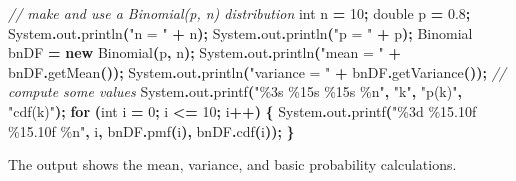 \documentclass[
]{book}
\newenvironment{Shaded}{\begin{snugshade}}{\end{snugshade}}
\newcommand{\BuiltInTok}[1]{#1}
\newcommand{\CommentTok}[1]{\textcolor[rgb]{0.56,0.35,0.01}{\textit{#1}}}
\newcommand{\ControlFlowTok}[1]{\textcolor[rgb]{0.13,0.29,0.53}{\textbf{#1}}}
\newcommand{\DataTypeTok}[1]{\textcolor[rgb]{0.13,0.29,0.53}{#1}}
\newcommand{\DecValTok}[1]{\textcolor[rgb]{0.00,0.00,0.81}{#1}}
\newcommand{\FloatTok}[1]{\textcolor[rgb]{0.00,0.00,0.81}{#1}}
\newcommand{\FunctionTok}[1]{\textcolor[rgb]{0.00,0.00,0.00}{#1}}
\newcommand{\KeywordTok}[1]{\textcolor[rgb]{0.13,0.29,0.53}{\textbf{#1}}}
\newcommand{\NormalTok}[1]{#1}
\newcommand{\OperatorTok}[1]{\textcolor[rgb]{0.81,0.36,0.00}{\textbf{#1}}}
\newcommand{\SpecialCharTok}[1]{\textcolor[rgb]{0.00,0.00,0.00}{#1}}
\newcommand{\StringTok}[1]{\textcolor[rgb]{0.31,0.60,0.02}{#1}}
\theoremstyle{definition}
\theoremstyle{definition}
\theoremstyle{definition}
\theoremstyle{definition}
\theoremstyle{remark}
\begin{document}
\begin{Shaded}
\begin{Highlighting}[]
\CommentTok{// make and use a Binomial(p, n) distribution}
\DataTypeTok{int}\NormalTok{ n }\OperatorTok{=} \DecValTok{10}\OperatorTok{;}
\DataTypeTok{double}\NormalTok{ p }\OperatorTok{=} \FloatTok{0.8}\OperatorTok{;}
\BuiltInTok{System}\OperatorTok{.}\FunctionTok{out}\OperatorTok{.}\FunctionTok{println}\OperatorTok{(}\StringTok{"n = "} \OperatorTok{+}\NormalTok{ n}\OperatorTok{);}
\BuiltInTok{System}\OperatorTok{.}\FunctionTok{out}\OperatorTok{.}\FunctionTok{println}\OperatorTok{(}\StringTok{"p = "} \OperatorTok{+}\NormalTok{ p}\OperatorTok{);}
\NormalTok{Binomial bnDF }\OperatorTok{=} \KeywordTok{new} \FunctionTok{Binomial}\OperatorTok{(}\NormalTok{p}\OperatorTok{,}\NormalTok{ n}\OperatorTok{);}
\BuiltInTok{System}\OperatorTok{.}\FunctionTok{out}\OperatorTok{.}\FunctionTok{println}\OperatorTok{(}\StringTok{"mean = "} \OperatorTok{+}\NormalTok{ bnDF}\OperatorTok{.}\FunctionTok{getMean}\OperatorTok{());}
\BuiltInTok{System}\OperatorTok{.}\FunctionTok{out}\OperatorTok{.}\FunctionTok{println}\OperatorTok{(}\StringTok{"variance = "} \OperatorTok{+}\NormalTok{ bnDF}\OperatorTok{.}\FunctionTok{getVariance}\OperatorTok{());}
\CommentTok{// compute some values}
\BuiltInTok{System}\OperatorTok{.}\FunctionTok{out}\OperatorTok{.}\FunctionTok{printf}\OperatorTok{(}\StringTok{"}\SpecialCharTok{\%3s}\StringTok{ }\SpecialCharTok{\%15s}\StringTok{ }\SpecialCharTok{\%15s}\StringTok{ }\SpecialCharTok{\%n}\StringTok{"}\OperatorTok{,} \StringTok{"k"}\OperatorTok{,} \StringTok{"p(k)"}\OperatorTok{,} \StringTok{"cdf(k)"}\OperatorTok{);}
\ControlFlowTok{for} \OperatorTok{(}\DataTypeTok{int}\NormalTok{ i }\OperatorTok{=} \DecValTok{0}\OperatorTok{;}\NormalTok{ i }\OperatorTok{\textless{}=} \DecValTok{10}\OperatorTok{;}\NormalTok{ i}\OperatorTok{++)} \OperatorTok{\{}
    \BuiltInTok{System}\OperatorTok{.}\FunctionTok{out}\OperatorTok{.}\FunctionTok{printf}\OperatorTok{(}\StringTok{"}\SpecialCharTok{\%3d}\StringTok{ }\SpecialCharTok{\%15.10f}\StringTok{ }\SpecialCharTok{\%15.10f}\StringTok{ }\SpecialCharTok{\%n}\StringTok{"}\OperatorTok{,}\NormalTok{ i}\OperatorTok{,}\NormalTok{ bnDF}\OperatorTok{.}\FunctionTok{pmf}\OperatorTok{(}\NormalTok{i}\OperatorTok{),}\NormalTok{ bnDF}\OperatorTok{.}\FunctionTok{cdf}\OperatorTok{(}\NormalTok{i}\OperatorTok{));}
\OperatorTok{\}}
\end{Highlighting}
\end{Shaded}

The output shows the mean, variance, and basic probability calculations.
\end{document}
